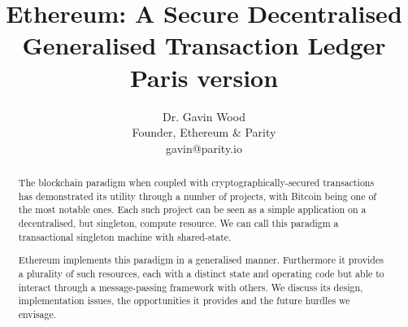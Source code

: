 \documentclass[9pt,oneside]{amsart}
\title[Ethereum: A Secure Decentralised Generalised Transaction Ledger\\ \smaller \textbf{{Paris version}}]{Ethereum: A Secure Decentralised Generalised Transaction Ledger \\ \smaller \textbf{{Paris version \YellowPaperVersionNumber}}}
\author{
    Dr. Gavin Wood\\
    Founder, Ethereum \& Parity\\
    gavin@parity.io
}
\begin{document}
\pagecolor{pagecolor}

\begin{abstract}
The blockchain paradigm when coupled with cryptographically-secured transactions has demonstrated its utility through a number of projects, with Bitcoin being one of the most notable ones. Each such project can be seen as a simple application on a decentralised, but singleton, compute resource. We can call this paradigm a transactional singleton machine with shared-state.

Ethereum implements this paradigm in a generalised manner. Furthermore it provides a plurality of such resources, each with a distinct state and operating code but able to interact through a message-passing framework with others. We discuss its design, implementation issues, the opportunities it provides and the future hurdles we envisage.
\end{abstract}

\maketitle
\end{document}
